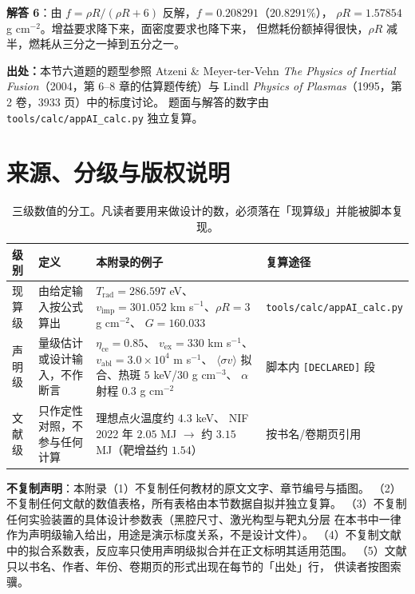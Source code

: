\textbf{解答 6}：由 $f = \rho R/(\rho R+6)$ 反解，$f = 0.208291$（$20.8291\%$），
$\rho R = 1.57854$ g cm$^{-2}$。增益要求降下来，面密度要求也降下来，
但燃耗份额掉得很快，$\rho R$ 减半，燃耗从三分之一掉到五分之一。

\textbf{出处：}本节六道题的题型参照 Atzeni \& Meyer-ter-Vehn
\emph{The Physics of Inertial Fusion}（2004，第 6--8 章的估算题传统）与
Lindl \emph{Physics of Plasmas}（1995，第 2 卷，3933 页）中的标度讨论。
题面与解答的数字由 \texttt{tools/\allowbreak{}calc/\allowbreak{}appAI\_calc.py} 独立复算。

\section{来源、分级与版权说明}
\label{sec:app-ai-source}

\begingroup\small

\begin{table}[htbp]
\centering
\small
\caption{三级数值的分工。凡读者要用来做设计的数，必须落在「现算级」并能被脚本复现。}
\label{tab:app-ai-source}
\begin{tabular}{p{2.2cm}p{4.6cm}p{3.6cm}p{3.6cm}}
\toprule
级别 & 定义 & 本附录的例子 & 复算途径 \\
\midrule
现算级 & 由给定输入按公式算出 & $T_{\mathrm{rad}} = 286.597$ eV、
$v_{\mathrm{imp}} = 301.052$ km s$^{-1}$、$\rho R = 3$ g cm$^{-2}$、
$G = 160.033$ & \texttt{tools/\allowbreak{}calc/\allowbreak{}appAI\_calc.py} \\
声明级 & 量级估计或设计输入，不作断言 & $\eta_{\mathrm{ce}} = 0.85$、
$v_{\mathrm{ex}} = 330$ km s$^{-1}$、$v_{\mathrm{abl}} = 3.0\times10^{4}$ m s$^{-1}$、
$\langle\sigma v\rangle$ 拟合、热斑 $5$ keV/$30$ g cm$^{-3}$、
$\alpha$ 射程 $0.3$ g cm$^{-2}$ & 脚本内 \texttt{[DECLARED]} 段 \\
文献级 & 只作定性对照，不参与任何计算 & 理想点火温度约 $4.3$ keV、
NIF 2022 年 $2.05$ MJ $\to$ 约 $3.15$ MJ（靶增益约 $1.54$） &
按书名/卷期页引用 \\
\bottomrule
\end{tabular}

\end{table}

\textbf{不复制声明}：本附录（1）不复制任何教材的原文文字、章节编号与插图。
（2）不复制任何文献的数值表格，所有表格由本节数据自拟并独立复算。
（3）不复制任何实验装置的具体设计参数表（黑腔尺寸、激光构型与靶丸分层
在本书中一律作为声明级输入给出，用途是演示标度关系，不是设计文件）。
（4）不复制文献中的拟合系数表，反应率只使用声明级拟合并在正文标明其适用范围。
（5）文献只以书名、作者、年份、卷期页的形式出现在每节的「出处」行，
供读者按图索骥。

